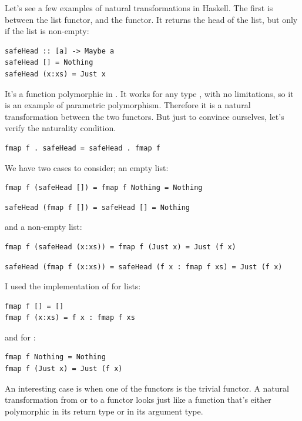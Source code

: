Let's see a few examples of natural transformations in Haskell. The
first is between the list functor, and the  functor. It
returns the head of the list, but only if the list is non-empty:

\begin{Verbatim}[commandchars=\\\{\}]
safeHead :: [a] -> Maybe a
safeHead [] = Nothing
safeHead (x:xs) = Just x
\end{Verbatim}
It's a function polymorphic in . It works for any type
, with no limitations, so it is an example of parametric
polymorphism. Therefore it is a natural transformation between the two
functors. But just to convince ourselves, let's verify the naturality
condition.

\begin{Verbatim}[commandchars=\\\{\}]
fmap f . safeHead = safeHead . fmap f
\end{Verbatim}
We have two cases to consider; an empty list:

\begin{Verbatim}[commandchars=\\\{\}]
fmap f (safeHead []) = fmap f Nothing = Nothing
\end{Verbatim}

\begin{Verbatim}[commandchars=\\\{\}]
safeHead (fmap f []) = safeHead [] = Nothing
\end{Verbatim}
and a non-empty list:

\begin{Verbatim}[commandchars=\\\{\}]
fmap f (safeHead (x:xs)) = fmap f (Just x) = Just (f x)
\end{Verbatim}
\begin{verbatim}
safeHead (fmap f (x:xs)) = safeHead (f x : fmap f xs) = Just (f x)
\end{verbatim}
I used the implementation of  for lists:

\begin{Verbatim}[commandchars=\\\{\}]
fmap f [] = []
fmap f (x:xs) = f x : fmap f xs
\end{Verbatim}
and for :

\begin{Verbatim}[commandchars=\\\{\}]
fmap f Nothing = Nothing
fmap f (Just x) = Just (f x)
\end{Verbatim}
An interesting case is when one of the functors is the trivial
 functor. A natural transformation from or to a
 functor looks just like a function that's either
polymorphic in its return type or in its argument type.

